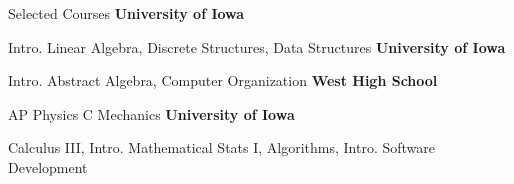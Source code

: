 \begin{rubric}{Selected Courses}
\entry*[Fall 2022]%
	\textbf{University of Iowa} \par Intro. Linear Algebra, Discrete Structures, Data Structures
%
\entry*[Spring 2023]%
	\textbf{University of Iowa} \par Intro. Abstract Algebra, Computer Organization
% 
\entry*[2022-2023]
    \textbf{West High School} \par AP Physics C Mechanics
%
\entry*[Fall 2023]%
	\textbf{University of Iowa} \par Calculus III, Intro. Mathematical Stats I, Algorithms, Intro. Software Development
\end{rubric}